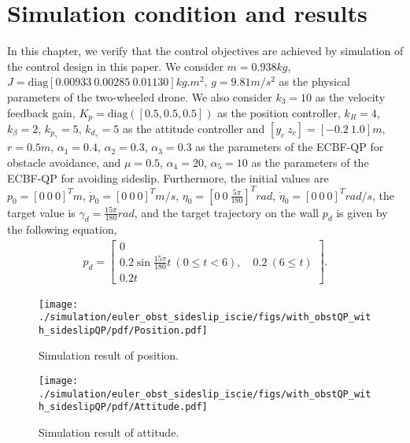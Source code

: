\section{Simulation condition and results}
\label{chap:simulation}

In this chapter, we verify that the control objectives are achieved by simulation of the control design in this paper.
We consider $ m = 0.938 \si{kg} $, $ J=\mathrm{diag}[0.00933 ~ 0.00285 ~ 0.01130] \si{kg.m^2} $, $ g = 9.81 \si{m/s^2} $ as the physical parameters of the two-wheeled drone.
We also consider $ k_3 = 10 $ as the velocity feedback gain, $ K_p = \mathrm{diag}([0.5, 0.5 ,0.5]) $ as the position controller, $ k_R = 4 $, $ k_{\beta} = 2 $, $ k_{p_{\gamma}} = 5 $, $ k_{d_{\gamma}} = 5 $ as the attitude controller and $ [y_c ~ z_c] = [-0.2 ~ 1.0] \si{m} $, $ r = 0.5 \si{m} $, $ \alpha_1 = 0.4 $, $ \alpha_2 = 0.3 $, $ \alpha_3 = 0.3 $ as the parameters of the ECBF-QP for obstacle avoidance, and $ \mu = 0.5 $, $ \alpha_4 = 20 $, $ \alpha_5 = 10 $ as the parameters of the ECBF-QP for avoiding sideslip.
Furthermore, the initial values are $ p_0 = [0 ~ 0 ~ 0]^T \si{m} $, $ \dot{p}_0 = [0 ~ 0 ~ 0]^T \si{m/s} $, $ \eta_0 = [0 ~ 0 ~ \frac{5 \pi}{180}]^T \si{rad} $, $ \dot{\eta}_0 = [0 ~ 0 ~ 0]^T \si{rad/s} $, the target value is $ \gamma_d = \frac{15 \pi}{180} \si{rad} $, and the target trajectory on the wall $ p_d $ is given by the following equation,
\begin{align*}
      p_d =
      \begin{bmatrix}
        0\\
        0.2 \sin \frac{15 \pi}{180}t ~ ( 0 \leq t < 6) ,  \quad 0.2 ~ (6 \leq t)\\
        0.2t
      \end{bmatrix}.
\end{align*}

\begin{figure}[t]
\centering
\texttt{[image: ./simulation/euler\_obst\_sideslip\_iscie/figs/with\_obstQP\_with\_sideslipQP/pdf/Position.pdf]}
\caption{Simulation result of position.}
\label{figs:simulation_result_of_position}
\end{figure}

\begin{figure}[t]
\centering
\texttt{[image: ./simulation/euler\_obst\_sideslip\_iscie/figs/with\_obstQP\_with\_sideslipQP/pdf/Attitude.pdf]}
\caption{Simulation result of attitude.}
\label{figs:simulation_result_of_attitude}
\end{figure}
 
